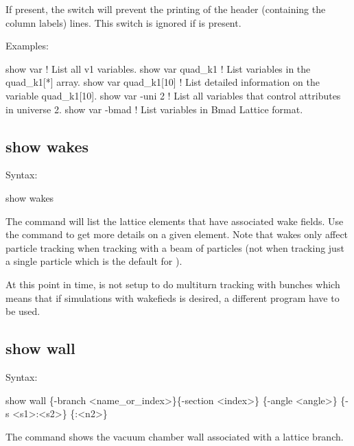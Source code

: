 {{{{{{If present, the  switch will prevent the printing of the header
(containing the column labels) lines. This switch is ignored if  is present.

Examples:
\begin{example}
  show var             ! List all v1 variables.
  show var quad_k1     ! List variables in the quad_k1[*] array.
  show var quad_k1[10] ! List detailed information on the variable quad_k1[10].
  show var -uni 2      ! List all variables that control attributes in universe 2.
  show var -bmad       ! List variables in Bmad Lattice format.
\end{example}


\subsection{show wakes}
\label{s:show.wakes}

Syntax:
\begin{example}
  show wakes 
\end{example}

The  command will list the lattice elements that have associated wake
fields.  Use the  command to get more details on a given element. Note that
wakes only affect particle tracking when tracking with a beam of particles (not when
tracking just a single particle which is the default for \tao). 

At this point in time, \tao is not setup to do multiturn tracking with bunches which means
that if simulations with wakefieds is desired, a different program have to be used.


\subsection{show wall}
\label{s:show.wall}

Syntax:
\begin{example}
  show wall \{-branch <name_or_index>\}\{-section <index>\} \{-angle <angle>\}
  \{-s <s1>:<s2>\} \{<n1>:<n2>\}
\end{example}

The  command shows the vacuum chamber wall associated with a lattice branch.

}}}}}}
